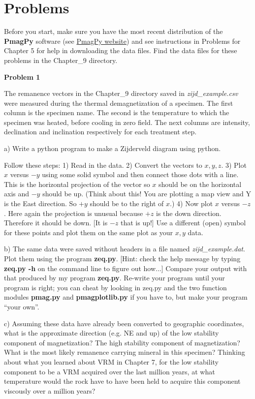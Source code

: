 \section{Problems}
{\parindent 0pt  \parskip 6pt

Before you start, make sure you have the most recent distribution of the {\bf PmagPy} software (see \href{http://earthref.org/PmagPy/cookbook/}{PmagPy website}) and see instructions in Problems for Chapter 5 for help in downloading the data files.  Find the data files for these problems in the Chapter\_9 directory.    


  
{\bf Problem 1 }

The remanence vectors in the Chapter\_9 directory saved in {\it zijd\_example.csv} were measured during the 
thermal demagnetization of a specimen.  The first column is the specimen name. The second is the temperature to which the specimen was heated, before cooling in zero field.  The next columns are intensity, declination and inclination respectively for each   treatment step.  

a) Write a python program to make a Zijderveld diagram using python.  
 
Follow these steps:  1) Read in the data.  2) Convert the vectors to $x, y, z$.  3) Plot $x$ versus $-y$ using some solid symbol and then connect those dots with a line.  This is the horizontal projection  of the vector so $x$ should be on the horizontal axis and $-y$ should be up. (Think about this!   You are plotting a map view and Y is the East direction.  So $+y$ should be to the right of $x$.)   4) Now plot $ x $ versus $-z$.  Here again the projection is unusual because $+z$ is the down direction. Therefore it should be down.  [It is  $-z$ that is up!]    Use a different (open) symbol for these points and plot them on the same plot as your $x,y$ data.   

b) The same data were saved without headers in a file named  {\it zijd\_example.dat}.  Plot them using the program {\bf zeq.py}. [Hint:  check the help message by typing {\bf zeq.py -h} on the command line to figure out how...] 
Compare your output with that produced by my program {\bf zeq.py}.  Re-write your program until your program is right; you can cheat by looking in zeq.py and the two function modules {\bf pmag.py} and {\bf pmagplotlib.py}   if you have to, but make your program ``your own''.    



c)     Assuming these data have already been converted to geographic coordinates, what is the approximate direction (e.g. NE and up) of the low stability component
of magnetization? The high stability component of magnetization? What is
the most likely remanence carrying mineral in this specimen?   Thinking about what you learned about VRM in Chapter 7, for the low stability component to be a VRM acquired over the last million years,  at what temperature would the rock have to have been held to acquire this component viscously over a million years?  


}
